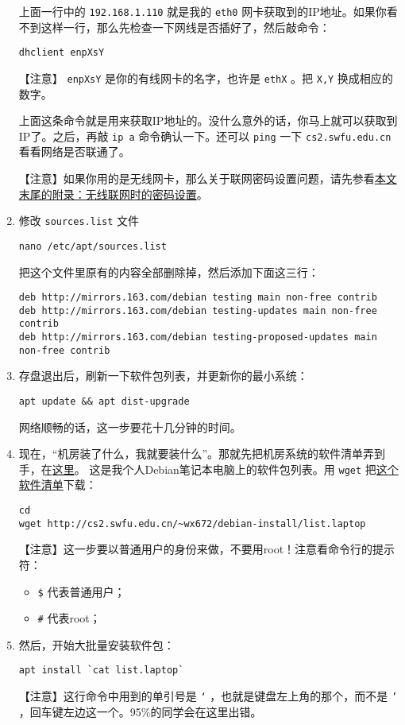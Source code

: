 \documentclass{wx672ctexart}
\begin{document}
\begin{enumerate}
上面一行中的 \texttt{192.168.1.110} 就是我的 \texttt{eth0} 网卡获取到的IP地址。如果你看不到这样一行，那么先检查一下网线是否插好了，然后敲命令：
\begin{verbatim}
dhclient enpXsY
\end{verbatim}
【注意】 \texttt{enpXsY} 是你的有线网卡的名字，也许是 \texttt{ethX} 。把 \texttt{X,Y} 换成相应的数字。

上面这条命令就是用来获取IP地址的。没什么意外的话，你马上就可以获取到IP了。之后，再敲 \texttt{ip a} 命令确认一下。还可以 \texttt{ping} 一下 \texttt{cs2.swfu.edu.cn} 看看网络是否联通了。

【注意】如果你用的是无线网卡，那么关于联网密码设置问题，请先参看\hyperref[sec:orgc0a8978]{本文末尾的附录：无线联网时的密码设置}。

\item 修改 \texttt{sources.list} 文件
\begin{verbatim}
nano /etc/apt/sources.list
\end{verbatim}
把这个文件里原有的内容全部删除掉，然后添加下面这三行：
\begin{verbatim}
deb http://mirrors.163.com/debian testing main non-free contrib
deb http://mirrors.163.com/debian testing-updates main non-free contrib
deb http://mirrors.163.com/debian testing-proposed-updates main non-free contrib
\end{verbatim}

\item 存盘退出后，刷新一下软件包列表，并更新你的最小系统：
\begin{verbatim}
apt update && apt dist-upgrade
\end{verbatim}
网络顺畅的话，这一步要花十几分钟的时间。
\item 现在，“机房装了什么，我就要装什么”。那就先把机房系统的软件清单弄到手，在\href{http://cs2.swfu.edu.cn/\~wx672/debian-install/list.laptop}{这里}。
这是我个人Debian笔记本电脑上的软件包列表。用 \texttt{wget} 把\href{http://cs2.swfu.edu.cn/\~wx672/debian-install/list.laptop}{这个软件清单}下载：
\begin{verbatim}
cd
wget http://cs2.swfu.edu.cn/~wx672/debian-install/list.laptop
\end{verbatim}
【注意】这一步要以普通用户的身份来做，不要用root！注意看命令行的提示符：
\begin{itemize}
\item \texttt{\$} 代表普通用户；
\item \texttt{\#} 代表root；
\end{itemize}
\item 然后，开始大批量安装软件包：
\begin{verbatim}
apt install `cat list.laptop`
\end{verbatim}
【注意】这行命令中用到的单引号是 \texttt{`} ，也就是键盘左上角的那个，而不是 \texttt{'} ，回车键左边这一个。95\%的同学会在这里出错。


\end{enumerate}
\end{document}
